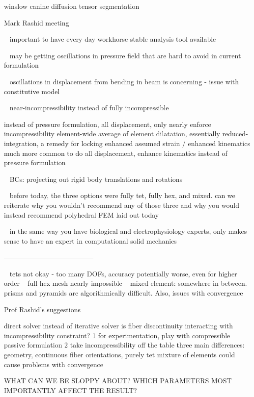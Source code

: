 winslow canine diffusion tensor segmentation


Mark Rashid meeting

~ important to have every day workhorse stable analysis tool available

~ may be getting oscillations in pressure field that are hard to avoid in current formulation

~ oscillations in displacement from bending in beam is concerning - issue with constitutive model

~ near-incompressibility instead of fully incompressible

instead of pressure formulation, all displacement, only nearly enforce incompressibility
element-wide average of element dilatation, essentially reduced-integration, a remedy for locking
enhanced assumed strain / enhanced kinematics
much more common to do all displacement, enhance kinematics instead of pressure formulation

~ BCs: projecting out rigid body translations and rotations

~ before today, the three options were fully tet, fully hex, and mixed. can we reiterate why you wouldn’t recommend any of those three and why you would instead recommend polyhedral FEM laid out today

~ in the same way you have biological and electrophysiology experts, only makes sense to have an expert in computational solid mechanics

---------------------------------------

~ tets not okay - too many DOFs, accuracy potentially worse, even for higher order
~ full hex mesh nearly impossible
~ mixed element: somewhere in between. prisms and pyramids are algorithmically difficult. Also, issues with convergence



Prof Rashid’s suggestions

direct solver instead of iterative solver
is fiber discontinuity interacting with incompressibility constraint?
1 for experimentation, play with compressible passive formulation
2 take incompressibility off the table
three main differences: geometry, continuous fiber orientations, purely tet
mixture of elements could cause problems with convergence

WHAT CAN WE BE SLOPPY ABOUT? WHICH PARAMETERS MOST IMPORTANTLY AFFECT THE RESULT?